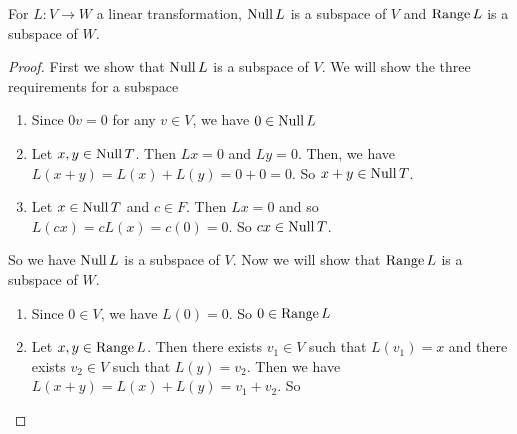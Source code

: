 \documentclass[main.tex]{subfiles}
\begin{document}
    \begin{prop}{}{}
        For $L: V\to W$ a linear transformation, $\operatorname{Null} L$ is a subspace of $V$ and $\operatorname{Range} L$ is a subspace of $W$. 
    \end{prop}
    \begin{proof}
        First we show that $\operatorname{Null} L$ is a subspace of $V$. We will show the three requirements for a subspace 
        \begin{enumerate}
            \item Since $0v = 0$ for any $v\in V$, we have $0\in \operatorname{Null} L$
            \item Let $x,y\in \operatorname{Null} T$. Then $Lx = 0$ and $Ly = 0$. Then, we have $L(x + y) = L(x) + L(y) = 0 + 0 = 0$. So $x+y\in \operatorname{Null} T$. 
            \item Let $x\in \operatorname{Null} T$ and $c\in F$. Then $Lx = 0$ and so $L(cx) = cL(x) = c(0) = 0$. So $cx\in \operatorname{Null} T$.
        \end{enumerate}
        So we have $\operatorname{Null} L$ is a subspace of $V$. Now we will show that $\operatorname{Range} L$ is a subspace of $W$. 
        \begin{enumerate}
            \item Since $0\in V$, we have $L(0) = 0$. So $0 \in \operatorname{Range} L$
            \item Let $x,y\in \operatorname{Range} L$. Then there exists $v_1\in V$ such that $L(v_1) = x$ and there exists $v_2\in V$ such that $L(y) = v_2$. Then we have $L(x + y) = L(x) + L(y) = v_1 + v_2$. So 
        \end{enumerate}
    \end{proof}
\end{document}
